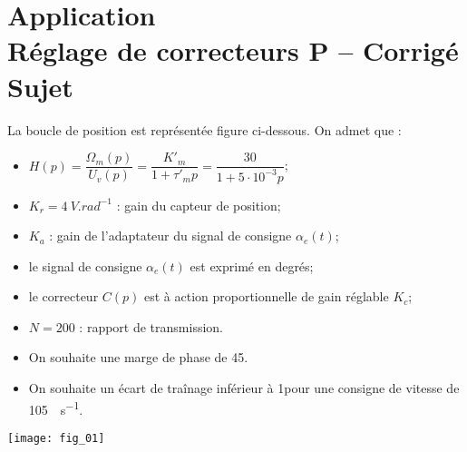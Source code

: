 \chapter*{Application  \\ 
Réglage de correcteurs P -- 
\ifprof Corrigé \else Sujet \fi}

\iflivret {} \else
\ifprof  {} \else \fi
\fi

\setcounter{question}{0}


La boucle de position est représentée figure ci-dessous. On admet que : 
\begin{itemize}
\item $H(p)=\dfrac{\Omega_m(p)}{U_v(p)}=\dfrac{K'_m}{1+\tau'_m p}=\dfrac{30}{1+5\cdot 10^{-3} p}$;
\item $K_r = \SI{4}{V.rad^{-1}}$ : gain du capteur de position;
\item $K_a$ : gain de l'adaptateur du signal de consigne $\alpha_e(t)$;
\item le signal de consigne $\alpha_e(t)$ est exprimé en degrés;
\item le correcteur $C(p)$ est à action proportionnelle de gain réglable $K_c$;
\item $N=200$ : rapport de transmission.
\end{itemize}

\begin{obj}
\begin{itemize}
\item On souhaite une marge de phase de 45\degres.
\item On souhaite un écart de traînage inférieur à 1\degres pour une consigne de vitesse de \SI{105}{\degres.s^{-1}}. 
\end{itemize}
\end{obj}

\begin{center}
\texttt{[image: fig\_01]}
\end{center}


